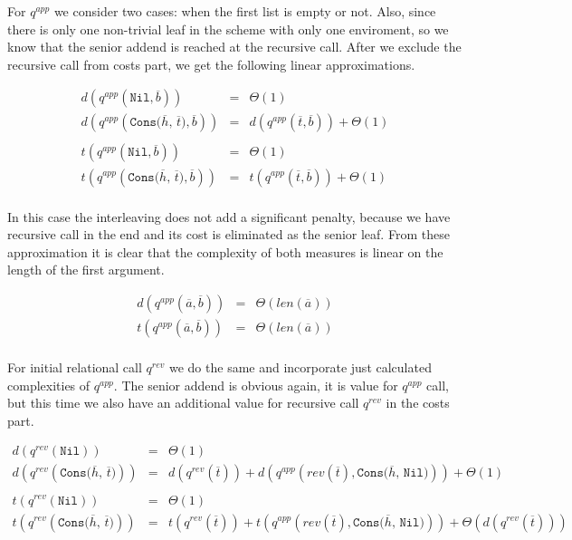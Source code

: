 For $q^{app}$ we consider two cases: when the first list is empty or not. Also, since there is only one non-trivial leaf in the scheme with only one enviroment, so we know that the senior addend is reached at the recursive call. After we exclude the recursive call from costs part, we get the following linear approximations. 

\[
\begin{array}{lcl}
d(q^{app}(\texttt{Nil}, \overline{b})) & = & \Theta(1) \\
d(q^{app}(\texttt{Cons($\overline{h}$, $\overline{t}$)}, \overline{b})) & = & d(q^{app}(\overline{t}, \overline{b})) + \Theta(1) \\
\\
t(q^{app}(\texttt{Nil}, \overline{b})) & = & \Theta(1) \\
t(q^{app}(\texttt{Cons($\overline{h}$, $\overline{t}$)}, \overline{b})) & = & t(q^{app}(\overline{t}, \overline{b})) + \Theta(1) \\
\end{array}
 \]
 
In this case the interleaving does not add a significant penalty, because we have recursive call in the end and its cost is eliminated as the senior leaf. From these approximation it is clear that the complexity of both measures is linear on the length of the first argument.

\[
\begin{array}{lcl}
d(q^{app}(\overline{a}, \overline{b})) & = & \Theta(len(\overline{a})) \\
t(q^{app}(\overline{a}, \overline{b})) & = & \Theta(len(\overline{a})) \\
\end{array}
 \]
 
For initial relational call $q^{rev}$ we do the same and incorporate just calculated complexities of $q^{app}$. The senior addend is obvious again, it is value for $q^{app}$ call, but this time we also have an additional value for recursive call $q^{rev}$ in the costs part.

\[
\begin{array}{lcl}
d(q^{rev}(\texttt{Nil})) & = & \Theta(1) \\
d(q^{rev}(\texttt{Cons($\overline{h}$, $\overline{t}$)})) & = & d(q^{rev}(\overline{t})) + d(q^{app}(rev(\overline{t}), \texttt{Cons($\overline{h}$, Nil)})) + \Theta(1) \\
\\
t(q^{rev}(\texttt{Nil})) & = & \Theta(1) \\
t(q^{rev}(\texttt{Cons($\overline{h}$, $\overline{t}$)})) & = & t(q^{rev}(\overline{t})) + t(q^{app}(rev(\overline{t}), \texttt{Cons($\overline{h}$, Nil)})) + \Theta(d(q^{rev}(\overline{t}))) \\
\end{array}
 \]
 
